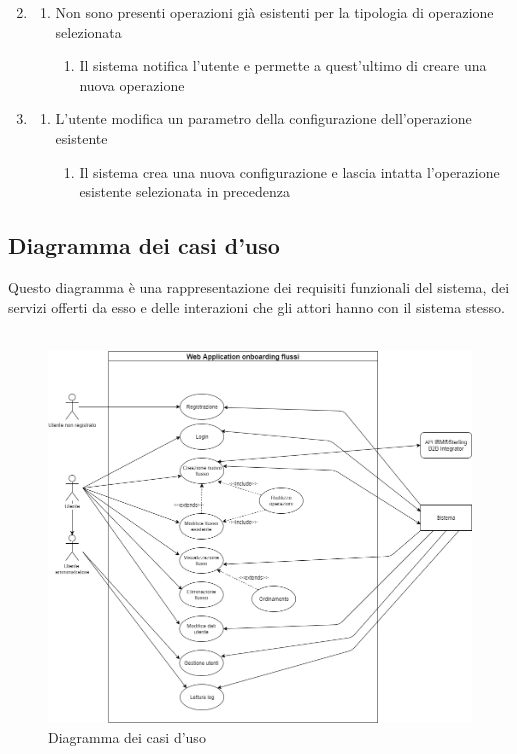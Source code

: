 \begin{enumerate}
\setcounter{enumi}{1}
\item
    \begin{enumerate}
        \item Non sono presenti operazioni già esistenti per la tipologia di operazione selezionata
        \begin{enumerate}
            \item Il sistema notifica l'utente e permette a quest'ultimo di creare una nuova operazione
        \end{enumerate}
    \end{enumerate}
\setcounter{enumi}{3}
\item
    \begin{enumerate}
        \item L'utente modifica un parametro della configurazione dell'operazione esistente
        \begin{enumerate}
            \item Il sistema crea una nuova configurazione e lascia intatta l'operazione esistente selezionata in precedenza
        \end{enumerate}
    \end{enumerate}
 \end{enumerate} 

\clearpage

\subsection{Diagramma dei casi d'uso}
Questo diagramma è una rappresentazione dei requisiti funzionali del sistema, dei servizi offerti da esso e delle interazioni che gli attori hanno con il sistema stesso. \\

\ \\
\begin{figure}
\begin{center}
\includegraphics[width=1.0\columnwidth]{images/diagramma_casi_d_uso.png}
\end{center}
\caption{Diagramma dei casi d'uso}
\label{fig:casiuso}
\end{figure}


